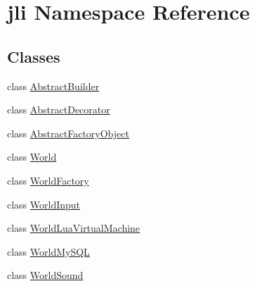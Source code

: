 \hypertarget{namespacejli}{\section{jli Namespace Reference}
\label{namespacejli}
}
\subsection*{Classes}
\begin{DoxyCompactItemize}
\item 
class \hyperlink{classjli_1_1_abstract_builder}{Abstract\+Builder}
\item 
class \hyperlink{classjli_1_1_abstract_decorator}{Abstract\+Decorator}
\item 
class \hyperlink{classjli_1_1_abstract_factory_object}{Abstract\+Factory\+Object}
\item 
class \hyperlink{classjli_1_1_world}{World}
\item 
class \hyperlink{classjli_1_1_world_factory}{World\+Factory}
\item 
class \hyperlink{classjli_1_1_world_input}{World\+Input}
\item 
class \hyperlink{classjli_1_1_world_lua_virtual_machine}{World\+Lua\+Virtual\+Machine}
\item 
class \hyperlink{classjli_1_1_world_my_s_q_l}{World\+My\+S\+Q\+L}
\item 
class \hyperlink{classjli_1_1_world_sound}{World\+Sound}
\end{DoxyCompactItemize}
